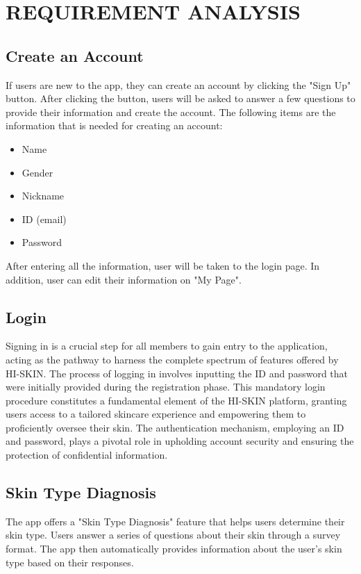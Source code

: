 \documentclass[conference]{IEEEtran}
\begin{document}
\section{REQUIREMENT ANALYSIS}

\subsection{Create an Account}
If users are new to the app, they can create an account by clicking the "Sign Up" button. After clicking the button, users will be asked to answer a few questions to provide their information and create the account. The following items are the information that is needed for creating an account:
\begin{itemize}
    \item Name
    \item Gender
    \item Nickname
    \item ID (email)
    \item Password
\end{itemize}
After entering all the information, user will be taken to the login page. In addition, user can edit their information on "My Page".\\
\subsection{Login}
Signing in is a crucial step for all members to gain entry to the application, acting as the pathway to harness the complete spectrum of features offered by HI-SKIN. The process of logging in involves inputting the ID and password that were initially provided during the registration phase. This mandatory login procedure constitutes a fundamental element of the HI-SKIN platform, granting users access to a tailored skincare experience and empowering them to proficiently oversee their skin. The authentication mechanism, employing an ID and password, plays a pivotal role in upholding account security and ensuring the protection of confidential information.\\
\subsection{Skin Type Diagnosis}
The app offers a "Skin Type Diagnosis" feature that helps users determine their skin type. Users answer a series of questions about their skin through a survey format. The app then automatically provides information about the user's skin type based on their responses.\\
\end{document}
